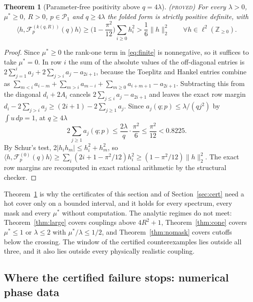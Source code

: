 \documentclass[11pt]{article}
\newcommand{\Fcal}{\mathcal F}
\newcommand{\muS}{\mu^{*}}
\newtheorem{theorem}{Theorem}[section]
\theoremstyle{definition}
\theoremstyle{remark}
\newcommand{\proved}{\textnormal{\textsc{(proved)}}}
\begin{document}
\begin{theorem}[Parameter-free positivity above $q=4\lambda$]\label{thm:asym}\proved
For every $\lambda>0$, $\muS\ge0$, $R>0$, $p\in\mathcal P_1$ and $q\ge4\lambda$ the
folded form is strictly positive definite, with
\begin{equation}\label{eq:asymstrict}
\langle h,\Fcal_p^{(k(q,R))}(q)h\rangle
\ge\Big(1-\frac{\pi^2}{12}\Big)\sum_{i\ge0}h_i^2>\frac16\|h\|_2^2
\qquad\forall h\in\ell^2(\mathbb Z_{\ge0}).
\end{equation}
\end{theorem}

\begin{proof}
Since $\muS\ge0$ the rank-one term in \eqref{eq:finite} is nonnegative, so it suffices to
take $\muS=0$. In row $i$ the sum of the absolute values of the off-diagonal entries is
$2\sum_{j=1}^i a_j+2\sum_{j>i}a_j-a_{2i+1}$, because the Toeplitz and Hankel entries
combine as $\sum_{m<i}a_{i-m}+\sum_{m>i}a_{m-i}+\sum_{m\ge0}a_{i+m+1}-a_{2i+1}$.
Subtracting this from the diagonal $d_i+2A_i$ cancels $2\sum_{j\le i}a_j-a_{2i+1}$ and
leaves the exact row margin $d_i-2\sum_{j>i}a_j\ge(2i+1)-2\sum_{j\ge1}a_j$. Since
$a_j(q;p)\le\lambda/(qj^2)$ by $\int u\,dp=1$, at $q\ge4\lambda$
\[
2\sum_{j\ge1}a_j(q;p)\le\frac{2\lambda}{q}\cdot\frac{\pi^2}{6}
\le\frac{\pi^2}{12}<0.8225 .
\]
By Schur's test, $2|h_ih_m|\le h_i^2+h_m^2$, so
$\langle h,\Fcal_p^{(0)}(q)h\rangle\ge\sum_i(2i+1-\pi^2/12)h_i^2
\ge(1-\pi^2/12)\|h\|_2^2$. The exact row margins are recomputed in exact rational
arithmetic by the structural checker.
\end{proof}

Theorem~\ref{thm:asym} is why the certificates of this section and of
Section~\ref{sec:cert} need a hot cover only on a bounded interval, and it holds for every
spectrum, every mask and every $\muS$ without computation. The analytic regimes do not
meet: Theorem~\ref{thm:large} covers couplings above $4R^2+1$,
Theorem~\ref{thm:cone} covers $\muS\le1$ or $\lambda\le2$ with $\muS/\lambda\le1/2$, and
Theorem~\ref{thm:nomask} covers cutoffs below the crossing. The window of the certified
counterexamples lies outside all three, and it also lies outside every physically
realistic coupling.

\subsection{Where the certified failure stops: numerical phase data}\label{sec:half:num}
\end{document}
